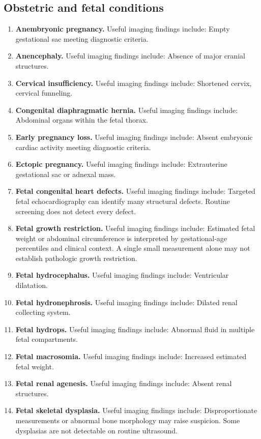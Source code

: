 \subsection{Obstetric and fetal conditions}
\begin{enumerate}[leftmargin=*,itemsep=0.45em,topsep=0.4em]
\item \textbf{Anembryonic pregnancy.} Useful imaging findings include: Empty gestational sac meeting diagnostic criteria.
\item \textbf{Anencephaly.} Useful imaging findings include: Absence of major cranial structures.
\item \textbf{Cervical insufficiency.} Useful imaging findings include: Shortened cervix, cervical funneling.
\item \textbf{Congenital diaphragmatic hernia.} Useful imaging findings include: Abdominal organs within the fetal thorax.
\item \textbf{Early pregnancy loss.} Useful imaging findings include: Absent embryonic cardiac activity meeting diagnostic criteria.
\item \textbf{Ectopic pregnancy.} Useful imaging findings include: Extrauterine gestational sac or adnexal mass.
\item \textbf{Fetal congenital heart defects.} Useful imaging findings include: Targeted fetal echocardiography can identify many structural defects. Routine screening does not detect every defect.
\item \textbf{Fetal growth restriction.} Useful imaging findings include: Estimated fetal weight or abdominal circumference is interpreted by gestational-age percentiles and clinical context. A single small measurement alone may not establish pathologic growth restriction.
\item \textbf{Fetal hydrocephalus.} Useful imaging findings include: Ventricular dilatation.
\item \textbf{Fetal hydronephrosis.} Useful imaging findings include: Dilated renal collecting system.
\item \textbf{Fetal hydrops.} Useful imaging findings include: Abnormal fluid in multiple fetal compartments.
\item \textbf{Fetal macrosomia.} Useful imaging findings include: Increased estimated fetal weight.
\item \textbf{Fetal renal agenesis.} Useful imaging findings include: Absent renal structures.
\item \textbf{Fetal skeletal dysplasia.} Useful imaging findings include: Disproportionate measurements or abnormal bone morphology may raise suspicion. Some dysplasias are not detectable on routine ultrasound.

\end{enumerate}
